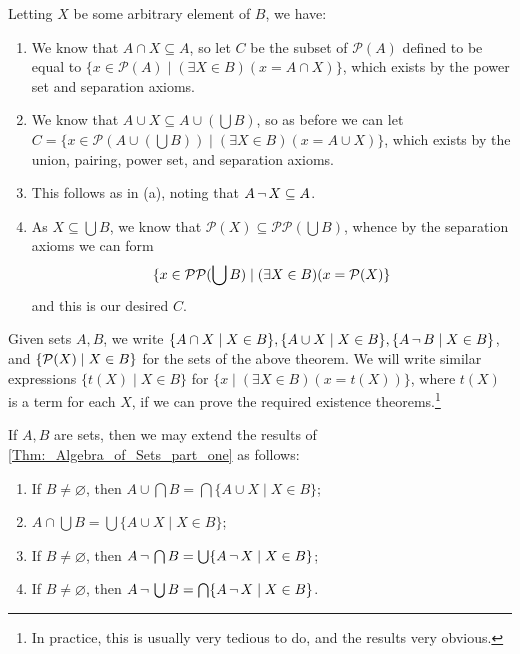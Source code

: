 \begin{prf} Letting $X$ be some arbitrary element of $B$, we have: 

\begin{enumerate}[label=(\alph*)]
\item We know that $A\cap X\subseteq A$, so let $C$ be the subset of $\mathcal{P}(A)$ defined to be equal to $\{x\in \mathcal{P}(A)\mid (\exists X\in B)(x = A\cap X)\}$, which exists by the power set and separation axioms.

\item We know that $A\cup X \subseteq A\cup (\bigcup B)$, so as before we can let $C = \{x\in\mathcal{P}(A\cup(\bigcup B))\mid(\exists X\in B)(x = A\cup X)\}$, which exists by the union, pairing, power set, and separation axioms. 

\item This follows as in (a), noting that $A\, \lnot \, X \subseteq A$. 

\item As $X\subseteq \bigcup B$, we know that $\mathcal{P}(X)\subseteq \mathcal{P}\mathcal{P}(\bigcup B)$, whence by the separation axioms we can form $$\{x\in \mathcal{P}\mathcal{P}(\bigcup B) \mid (\exists X\in B)(x=\mathcal{P} (X)\}$$ and this is our desired $C$.
\end{enumerate}
\end{prf}

\begin{defn}
\label{Defn:_Algebra_of_Sets_part_four}
Given sets $A, B$, we write  $\{A\cap X \mid X\in B\}, \linebreak \{A\cup X\mid X\in B\}, \{A\setnot B\mid X\in B\}$, and $\{\mathcal{P} (X)\mid X\in B\}$ for the sets of the above theorem. We will write similar expressions $\{t(X)\mid X\in B\}$ for $\{x\mid (\exists X\in B)(x = t(X))\}$, where $t(X)$ is a term for each $X$, if we can prove the required existence theorems.\footnote{In practice, this is usually very tedious to do, and the results very obvious.}
\end{defn}

\begin{thm}
If $A, B$ are sets, then we may extend the results of \autoref{Thm:_Algebra_of_Sets_part_one} as follows: 

\begin{enumerate}[label = (\alph*)]
\item If $B\neq \varnothing$, then $A\cup \bigcap B = \bigcap\{A\cup X\mid X\in B\}$;
\item $A\cap \bigcup B = \bigcup\{A\cup X \mid X\in B\}$; 
\item If $B\neq \varnothing$, then $A\, \lnot \,\bigcap B = \bigcup \{A\, \lnot \, X\mid X\in B\}$;
\item If $B\neq \varnothing$, then $A\, \lnot \,\bigcup B = \bigcap \{A\, \lnot \, X\mid X\in B\}$.
\end{enumerate}
\end{thm}


